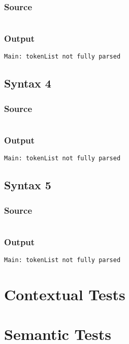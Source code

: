 \documentclass[twoside]{report}
\begin{document}
\subsection{Source}
\inputminted[tabsize=4,linenos,firstnumber=1]{text}{../test/syntax3.shl}
\subsection{Output}
\begin{verbatim}
Main: tokenList not fully parsed
\end{verbatim}

\section{Syntax 4}
\subsection{Source}
\inputminted[tabsize=4,linenos,firstnumber=1]{text}{../test/syntax4.shl}
\subsection{Output}
\begin{verbatim}
Main: tokenList not fully parsed
\end{verbatim}

\section{Syntax 5}
\subsection{Source}
\inputminted[tabsize=4,linenos,firstnumber=1]{text}{../test/syntax5.shl}
\subsection{Output}
\begin{verbatim}
Main: tokenList not fully parsed
\end{verbatim}

\chapter{Contextual Tests}

\chapter{Semantic Tests}
\end{document}
